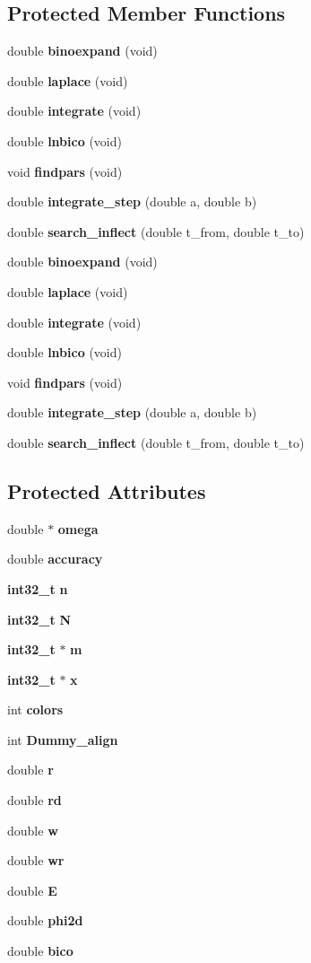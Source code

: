 \subsection*{Protected Member Functions}
\begin{DoxyCompactItemize}
\item 
double {\bf binoexpand} (void)
\item 
double {\bf laplace} (void)
\item 
double {\bf integrate} (void)
\item 
double {\bf lnbico} (void)
\item 
void {\bf findpars} (void)
\item 
double {\bf integrate\-\_\-step} (double a, double b)
\item 
double {\bf search\-\_\-inflect} (double t\-\_\-from, double t\-\_\-to)
\item 
double {\bf binoexpand} (void)
\item 
double {\bf laplace} (void)
\item 
double {\bf integrate} (void)
\item 
double {\bf lnbico} (void)
\item 
void {\bf findpars} (void)
\item 
double {\bf integrate\-\_\-step} (double a, double b)
\item 
double {\bf search\-\_\-inflect} (double t\-\_\-from, double t\-\_\-to)
\end{DoxyCompactItemize}
\subsection*{Protected Attributes}
\begin{DoxyCompactItemize}
\item 
double $\ast$ {\bf omega}
\item 
double {\bf accuracy}
\item 
{\bf int32\-\_\-t} {\bf n}
\item 
{\bf int32\-\_\-t} {\bf N}
\item 
{\bf int32\-\_\-t} $\ast$ {\bf m}
\item 
{\bf int32\-\_\-t} $\ast$ {\bf x}
\item 
int {\bf colors}
\item 
int {\bf Dummy\-\_\-align}
\item 
double {\bf r}
\item 
double {\bf rd}
\item 
double {\bf w}
\item 
double {\bf wr}
\item 
double {\bf E}
\item 
double {\bf phi2d}
\item 
double {\bf bico}
\end{DoxyCompactItemize}


